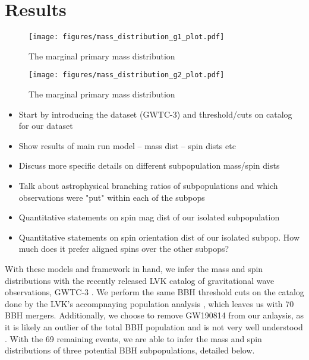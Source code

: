 \section{Results} \label{sec:results}

\begin{figure*}[ht!]
    \begin{centering}
        \texttt{[image: figures/mass\_distribution\_g1\_plot.pdf]}
        \caption{The marginal primary mass distribution}
        \label{fig:g1_mass_distribution}
    \end{centering}
\end{figure*}

\begin{figure*}[ht!]
    \begin{centering}
        \texttt{[image: figures/mass\_distribution\_g2\_plot.pdf]}
        \caption{The marginal primary mass distribution}
        \label{fig:g2_mass_distribution}
    \end{centering}
\end{figure*}


\begin{itemize}
    \item Start by introducing the dataset (GWTC-3) and threshold/cuts on catalog for our dataset
    \item Show results of main run model -- mass dist -- spin dists etc
    \item Discuss more specific details on different subpopulation mass/spin dists
    \item Talk about astrophysical branching ratios of subpopulations and which observations were "put" within each of the subpops
    \item Quantitative statements on spin mag dist of our isolated subpopulation
    \item Quantitative statements on spin orientation dist of our isolated subpop. How much does it prefer aligned spins over the other subpops?
\end{itemize}

With these models and framework in hand, we infer the mass and spin distributions with the recently released LVK catalog of gravitational wave observations, GWTC-3 . We perform the same BBH threshold cuts on the catalog done by the LVK's accompnaying population analysis , which leaves us with 70 BBH mergers. Additionally, we choose to remove GW190814 from our anlaysis, as it is likely an outlier of the total BBH population and is not very well understood . With the 69 remaining events, we are able to infer the mass and spin distributions of three potential BBH subpopulations, detailed below. 

